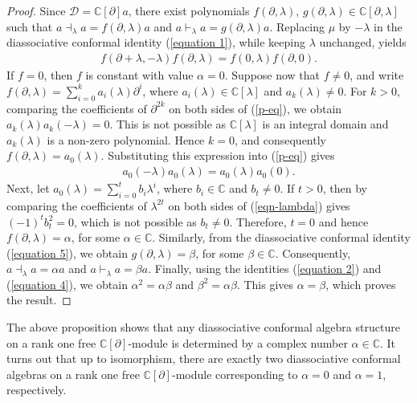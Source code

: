 \documentclass[a4paper,reqno,10pt]{amsart}
\theoremstyle{plain}
\theoremstyle{definition}
\theoremstyle{remark}
\newcommand{\C}{\mathbb{C}}
\newcommand{\p}{\partial}
\newcommand{\la}{\lambda}
\begin{document}
\begin{proof}
Since $\mathcal{D}=\mathbb{C}[\partial]a$, there exist polynomials
$f(\partial,\la), \, g(\partial,\la)\in\mathbb{C}[\partial,\la]$ such that $a\dashv_{\la}a=f(\partial,\la)a$ and $a\vdash_{\la}a=g(\partial,\la)a$.
Replacing $\mu$ by $-\la$ in the diassociative conformal identity (\ref{equation 1}), while keeping $\la$ unchanged, yields
\begin{align}\label{p-eq}
f(\partial+\la,-\la)f(\partial,\la)
=f(0,\la)f(\partial,0).
\end{align}
If $f=0$, then $f$ is constant with value $\alpha=0$. Suppose now that $f\neq0$, and write $f(\partial,\lambda)=\sum \limits_{i=0}^{k}a_{i}(\la)\p^i$, where $a_i(\la) \in \C[\la]$ and $a_k(\lambda)\neq0$. For $k>0$, comparing the coefficients of $\partial^{2k}$ on both sides of (\ref{p-eq}), we obtain $a_k(\la)a_k(-\la)=0$. This is not possible as $\mathbb{C}[\la]$ is an integral domain and $a_k(\la)$ is a non-zero polynomial. Hence $k=0$, and consequently $f(\partial,\la)=a_0(\la)$. Substituting this expression into (\ref{p-eq}) gives
\begin{align}\label{eqn-lambda}
a_0(-\la)a_0(\la)=a_0(\la)a_0(0).
\end{align}
Next, let $a_0(\la)= \sum \limits_{i=0}^{t}b_i \la^i$, where $b_i \in \C$ and $b_t\neq0$. If $t>0$, then by comparing the coefficients of $\la^{2t}$ on both sides of (\ref{eqn-lambda}) gives $(-1)^t b_t^2=0$, which is not possible as $b_t\neq0$. Therefore, $t=0$ and hence $f(\partial,\la)=\alpha$, for some $\alpha\in\mathbb{C}$. Similarly, from the diassociative conformal identity (\ref{equation 5}), we obtain $g(\partial,\la)=\beta$, for some $\beta\in\mathbb{C}$. Consequently, $a\dashv_{\la}a=\alpha  a$ and $a\vdash_{\la}a=\beta a$.
Finally, using the identities (\ref{equation 2}) and (\ref{equation 4}), we obtain $\alpha^2=\alpha\beta$ and $\beta^2=\alpha\beta$. This gives $\alpha=\beta$, which proves the result.
\end{proof}

The above proposition shows that any diassociative conformal algebra structure on a rank one free $\mathbb{C}[\partial]$-module is determined by a complex number $\alpha \in \mathbb{C}$. It turns out that up to isomorphism, there are exactly two diassociative conformal algebras on a rank one free $\mathbb{C}[\partial]$-module corresponding to $\alpha = 0$ and $\alpha =1$, respectively.
\end{document}
